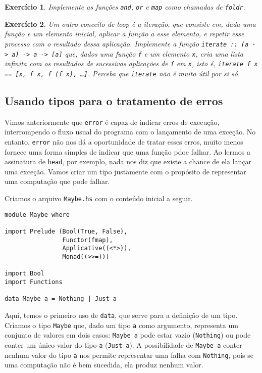 \documentclass[a4paper]{article}
\newtheorem{exercicio}{Exercício}
\begin{document}
\begin{exercicio}
	Implemente as funções \emph{\texttt{and}}, \emph{\texttt{or}} e \emph{\texttt{map}} como chamadas de \emph{\texttt{foldr}}.
\end{exercicio}

\begin{exercicio} \label{exercicio:iterate}
	Um outro conceito de \emph{loop} é a iteração, que consiste em, dada uma função e um elemento inicial, aplicar a função a esse elemento, e repetir esse processo com o resultado dessa aplicação.
	Implemente a função \emph{\texttt{iterate :: (a -> a) -> a -> [a]}} que, dados uma função \emph{\texttt{f}} e um elemento \emph{\texttt{x}}, cria uma lista infinita com os resultados de sucessivas aplicações de \emph{\texttt{f}} em \emph{\texttt{x}}, isto é, \emph{\texttt{iterate f x == [x, f x, f (f x), \dots]}}.
	Perceba que \emph{\texttt{iterate}} não é muito útil por si só.
\end{exercicio}

\subsection{Usando tipos para o tratamento de erros}

Vimos anteriormente que \texttt{error} é capaz de indicar erros de execução, interrompendo o fluxo usual do programa com o lançamento de uma exceção.
No entanto, \texttt{error} não nos dá a oportunidade de tratar esses erros, muito menos fornece uma forma simples de indicar que uma função pdoe falhar.
Ao lermos a assinatura de \texttt{head}, por exemplo, nada nos diz que existe a chance de ela lançar uma exceção.
Vamos criar um tipo justamente com o propósito de representar uma computação que pode falhar.

Criamos o arquivo \texttt{Maybe.hs} com o conteúdo inicial a seguir.

\begin{verbatim}
module Maybe where

import Prelude (Bool(True, False),
                Functor(fmap),
                Applicative((<*>)),
                Monad((>>=)))

import Bool
import Functions

data Maybe a = Nothing | Just a
\end{verbatim}

Aqui, temos o primeiro uso de \texttt{data}, que serve para a definição de um tipo.
Criamos o tipo \texttt{Maybe} que, dado um tipo \texttt{a} como argumento, representa um conjunto de valores em dois casos: \texttt{Maybe a} pode estar vazio (\texttt{Nothing}) ou pode conter um único valor do tipo \texttt{a} (\texttt{Just a}).
A possibilidade de \texttt{Maybe a} conter nenhum valor do tipo \texttt{a} nos permite representar uma falha com \texttt{Nothing}, pois se uma computação não é bem sucedida, ela produz nenhum valor.
\end{document}
